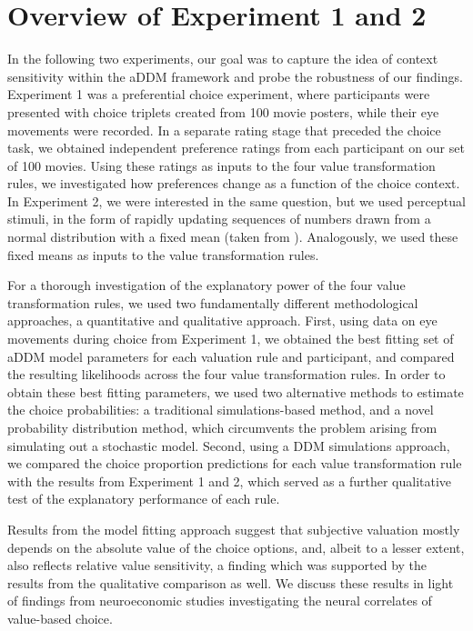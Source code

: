 \documentclass[11pt,a4paper]{article}
\begin{document}
\section{Overview of Experiment 1 and 2}

In the following two experiments, our goal was to capture the idea of context sensitivity within the aDDM framework and probe the robustness of our findings. Experiment 1 was a preferential choice experiment, where participants were presented with choice triplets created from 100 movie posters, while their eye movements were recorded. In a separate rating stage that preceded the choice task, we obtained independent preference ratings from each participant on our set of 100 movies. Using these ratings as inputs to the four value transformation rules, we investigated how preferences change as a function of the choice context. In Experiment 2, we were interested in the same question, but we used perceptual stimuli, in the form of rapidly updating sequences of numbers drawn from a normal distribution with a fixed mean (taken from ). Analogously, we used these fixed means as inputs to the value transformation rules.


For a thorough investigation of the explanatory power of the four value transformation rules, we used two fundamentally different methodological approaches, a quantitative and qualitative approach. First, using data on eye movements during choice from Experiment 1, we obtained the best fitting set of aDDM model parameters for each valuation rule and participant, and compared the resulting likelihoods across the four value transformation rules. In order to obtain these best fitting parameters, we used two alternative methods to estimate the choice probabilities: a traditional simulations-based method, and a novel probability distribution method, which circumvents the problem arising from simulating out a stochastic model. Second, using a DDM simulations approach, we compared the choice proportion predictions for each value transformation rule with the results from Experiment 1 and 2, which served as a further qualitative test of the explanatory performance of each rule. 

Results from the model fitting approach suggest that subjective valuation mostly depends on the absolute value of the choice options, and, albeit to a lesser extent, also reflects  relative value sensitivity, a finding which was supported by the results from the qualitative comparison as well. We discuss these results in light of findings from neuroeconomic studies investigating the neural correlates of value-based choice.
\end{document}
